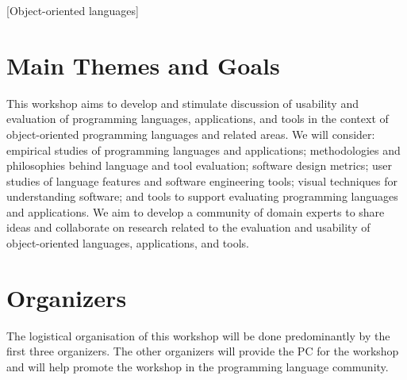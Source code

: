 \documentclass{acm_proc_article-sp}
\begin{document}
[Object-oriented languages]



\section{Main Themes and Goals}

This workshop aims to develop and stimulate discussion of usability and evaluation of programming languages, applications,  and tools in the context of object-oriented programming languages and related areas. 
We will consider: empirical studies of programming languages and applications; methodologies and philosophies behind language and tool evaluation; software design metrics; user studies of language features and software engineering tools; visual techniques for understanding software; and tools to support evaluating programming languages and applications. 
We aim to develop a community of domain experts to share ideas and collaborate on research related to the evaluation and usability of object-oriented languages, applications, and tools. 

\section{Organizers}

The logistical organisation of this workshop will be done predominantly by the first three organizers.
The other organizers will provide the PC for the workshop and will help 
promote the workshop in the programming language community. 
\end{document}
